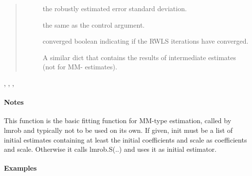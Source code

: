 \documentclass[letterpaper,10pt,english]{sphinxmanual}
\begin{document}
\begin{fulllineitems}
\begin{quote}
\begin{description}
\begin{description}
\item[{}] \leavevmode
the robustly estimated error standard deviation.

\item[{}] \leavevmode
the same as the control argument.

\item[{}] \leavevmode
converged boolean indicating if the RWLS iterations have converged.

\item[{}] \leavevmode
A similar dict that contains the results of intermediate estimates (not for MM-
estimates).

\end{description}

\end{description}\end{quote}




{\hyperref[\detokenize{_modules/lmrob:module-lmrob}]{}}, , , 


\paragraph{Notes}

This function is the basic fitting function for MM-type estimation, called by lmrob and typically
not to be used on its own.
If given, init must be a list of initial estimates containing at least the initial coefficients and scale
as coefficients and scale. Otherwise it calls lmrob.S(..) and uses it as initial estimator.
\paragraph{Examples}


\end{fulllineitems}
\end{document}

